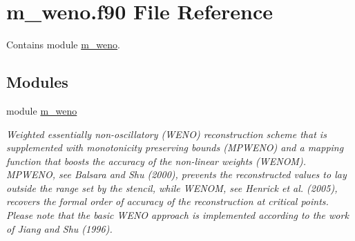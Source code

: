 \hypertarget{m__weno_8f90}{}\section{m\+\_\+weno.\+f90 File Reference}
\label{m__weno_8f90}


Contains module \hyperlink{namespacem__weno}{m\+\_\+weno}.  


\subsection*{Modules}
\begin{DoxyCompactItemize}
\item 
module \hyperlink{namespacem__weno}{m\+\_\+weno}
\begin{DoxyCompactList}\small\item\em Weighted essentially non-\/oscillatory (W\+E\+NO) reconstruction scheme that is supplemented with monotonicity preserving bounds (M\+P\+W\+E\+NO) and a mapping function that boosts the accuracy of the non-\/linear weights (W\+E\+N\+OM). M\+P\+W\+E\+NO, see Balsara and Shu (2000), prevents the reconstructed values to lay outside the range set by the stencil, while W\+E\+N\+OM, see Henrick et al. (2005), recovers the formal order of accuracy of the reconstruction at critical points. Please note that the basic W\+E\+NO approach is implemented according to the work of Jiang and Shu (1996). \end{DoxyCompactList}\end{DoxyCompactItemize}
